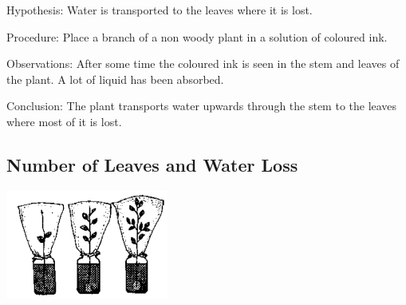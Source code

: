 \begin{multicols}{2}
\begin{description*}
\item[Hypothesis:]{Water is transported to the leaves where it is lost.}
\item[Procedure:]{Place a branch of a non woody plant in a solution of coloured ink.}
\item[Observations:]{After some time the coloured ink is seen in the stem and leaves of the plant. A lot of liquid has been absorbed.}
\item[Conclusion:]{The plant transports water upwards through the stem to the leaves where most of
it is lost.}
\end{description*}

\subsection{Number of Leaves and Water Loss}

\begin{center}
\includegraphics[width=0.4\textwidth]{./img/source/sci-meth-lose-water.png}
\end{center}


\end{multicols}
